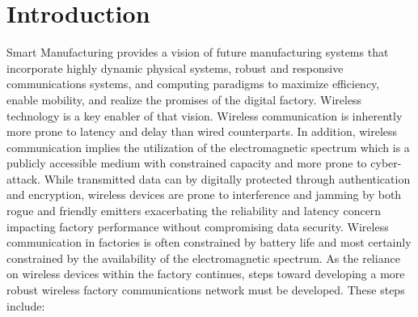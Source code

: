 \documentclass[twocolumn]{IEEEtran}
\begin{document}
	
		\section*{Introduction}
		Smart Manufacturing provides a vision of future manufacturing systems that incorporate highly dynamic physical systems, robust and responsive communications systems, and computing paradigms to maximize efficiency, enable mobility, and realize the promises of the digital factory.  Wireless technology is a key enabler of that vision. Wireless communication is inherently more prone to latency and delay than wired counterparts.  In addition, wireless communication implies the utilization of the electromagnetic spectrum which is a publicly accessible medium with constrained capacity and more prone to cyber-attack.  While transmitted data can by digitally protected through authentication and encryption, wireless devices are prone to interference and jamming by both rogue and friendly emitters exacerbating the reliability and latency concern impacting factory performance without compromising data security.  Wireless communication in factories is often constrained by battery life and most certainly constrained by the availability of the electromagnetic spectrum.   As the reliance on wireless devices within the factory continues, steps toward developing a more robust wireless factory communications network must be developed. These steps include:
			
\end{document}
